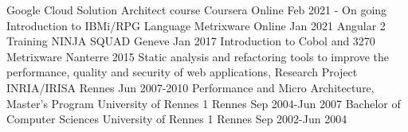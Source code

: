 
\begin{cventries}

\cventry
{Google Cloud Solution Architect course} %
{Coursera} %
{Online} %
{Feb 2021 - On going} %
{
}
\cventry
{Introduction to IBMi/RPG Language} %
{Metrixware} %
{Online} %
{Jan 2021} %
{
}
\cventry
{Angular 2 Training} %
{NINJA SQUAD} %
{Geneve} %
{Jan 2017} %
{
}
\cventry
{Introduction to Cobol and 3270} %
{Metrixware} %
{Nanterre} %
{2015} %
{
}
\cventry
{Static analysis and refactoring tools to improve the performance, quality and security of web applications, Research Project} %
{INRIA/IRISA} %
{Rennes} %
{Jun 2007-2010} %
{
}
\cventry
{Performance and Micro Architecture, Master's Program} %
{University of Rennes 1} %
{Rennes} %
{Sep 2004-Jun 2007} %
{
}
\cventry
{Bachelor of Computer Sciences} %
{University of Rennes 1} %
{Rennes} %
{Sep 2002-Jun 2004} %
{
}
\end{cventries}